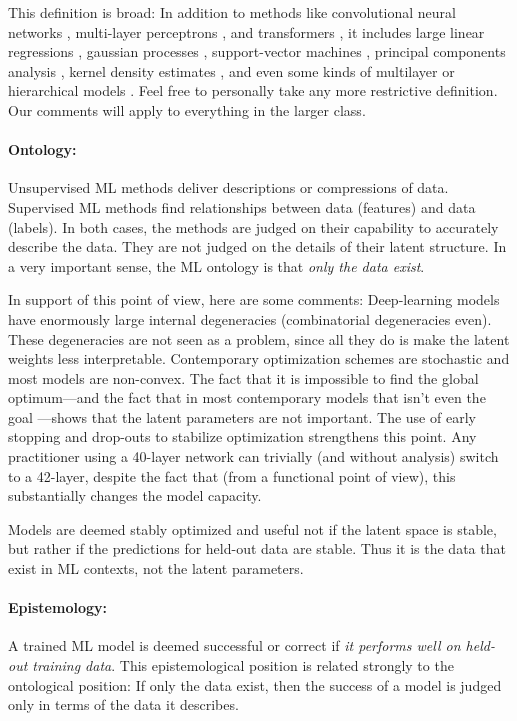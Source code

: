 \documentclass[11pt]{article}
\begin{document}
This definition is broad:
In addition to methods like convolutional neural networks \cite{cnn}, multi-layer perceptrons \cite{mlp}, and transformers \cite{transformer}, it includes large linear regressions \cite{linearregression}, gaussian processes \cite{gp}, support-vector machines \cite{svm}, principal components analysis \cite{pca}, kernel density estimates \cite{kde}, and even some kinds of multilayer or hierarchical models \cite{multilevel}.
Feel free to personally take any more restrictive definition.
Our comments will apply to everything in the larger class.

\paragraph{Ontology:}
Unsupervised ML methods deliver descriptions or compressions of data.
Supervised ML methods find relationships between data (features) and data (labels).
In both cases, the methods are judged on their capability to accurately describe the data.
They are not judged on the details of their latent structure.
In a very important sense, the ML ontology is that \emph{only the data exist}.

In support of this point of view, here are some comments:
Deep-learning models have enormously large internal degeneracies (combinatorial degeneracies even).
These degeneracies are not seen as a problem, since all they do is make the latent weights less interpretable.
Contemporary optimization schemes are stochastic \cite{stochastic} and most models are non-convex.
The fact that it is impossible to find the global optimum---and the fact that in most contemporary models that isn't even the goal \cite{not_global}---shows that the latent parameters are not important.
The use of early stopping \cite{early_stop} and drop-outs \cite{dropout} to stabilize optimization strengthens this point.
Any practitioner using a 40-layer network can trivially (and without analysis) switch to a 42-layer, despite the fact that (from a functional point of view), this substantially changes the model capacity.

Models are deemed stably optimized and useful not if the latent space is stable, but rather if the predictions for held-out data are stable.
Thus it is the data that exist in ML contexts, not the latent parameters.

\paragraph{Epistemology:}
A trained ML model is deemed successful or correct if \emph{it performs well on held-out training data}.
This epistemological position is related strongly to the ontological position:
If only the data exist, then the success of a model is judged only in terms of the data it describes.
\end{document}
